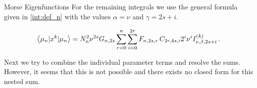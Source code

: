 \begin{chapter}{Morse Eigenfunctions}
For the remaining integrals we use the general formula given in
\eqref{int:def_n} with the values $\alpha = \nu$ and $\gamma = 2s + i$.

\begin{align}
    \left\langle \mu_{n} | x^{k} | \mu_{n} \right\rangle
    =
    N_{n}^{2} \nu^{2s} G_{n,2s}
    \sum_{r=0}^{n}
    \sum_{i=0}^{2 r}
    F_{n,2s,r} \, C_{2r,4s,i} 2^{i} \nu^{i} I_{\nu,\beta,2s+i}^{(k)} \,.
\end{align}

Next we try to combine the individual parameter terms and resolve the sums.
However, it seems that this is not possible and there exists no closed form
for this nested sum.


\end{chapter}
